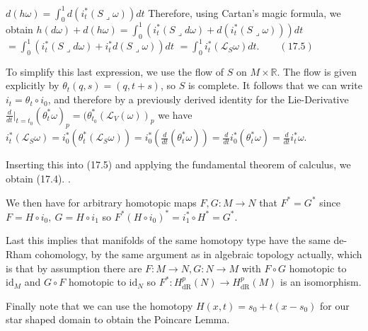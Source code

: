 \(d(h\omega)=\int_{0}^{1}d(i_{t}^{*}(S \lrcorner \omega))dt\)
Therefore, using Cartan's magic formula, we obtain
\(h(d\omega)+d(h\omega)=\int_{0}^{1}(i_{t}^{*}(S \lrcorner d\omega)+d(i_{t}^{*}(S \lrcorner \omega)))dt\)
\(=\int_{0}^{1}(i_{t}^{*}(S \lrcorner d\omega)+i_{t}^{*}d(S \lrcorner \omega))dt\)
\(=\int_{0}^{1}i_{t}^{*}(\mathcal{L}_{S}\omega)dt. \qquad (17.5)\)

To simplify this last expression, we use the flow of \(S\) on \(M \times \mathbb{R}\). 
The flow is given explicitly by \(\theta_{t}(q,s)=(q,t+s)\), so \(S\) is complete. It
follows that we can write \(i_{t}=\theta_{t} \circ i_{0}\), and therefore by a previously derived identity for the Lie-Derivative 
\( \frac{d}{dt}|_{t = t_0}(\theta^\ast_t \omega)_p = (\theta^\ast_{t_0}(\mathcal{L}_V(\omega))_p \)
we have
\(i_{t}^{*}(\mathcal{L}_{S}\omega)=i_{0}^{*}(\theta_{t}^{*}(\mathcal{L}_{S}\omega))=i_{0}^{*}(\frac{d}{dt}(\theta_{t}^{*}\omega))=\frac{d}{dt}i_{0}^{*}(\theta_{t}^{*}\omega)=\frac{d}{dt}i_{t}^{*}\omega.\)

Inserting this into (17.5) and applying the fundamental theorem of calculus, we
obtain (17.4). \qquad \square.

We then have for arbitrary homotopic maps  \( F, G : M \to N \) that 
\( F^\ast = G^\ast \) since \( F = H \circ i_0,\ G = H \circ i_1 \)
so \( F^\ast (H \circ i_0)^\ast = i_1^\ast \circ H^\ast = G^\ast \).

Last this implies that manifolds of the same homotopy type have the same de-Rham cohomology,
by the same argument as in algebraic topology actually, which is 
that by assumption there are \( F : M \to N, G : N \to M \) with \( F \circ G \) homotopic to \( \text{id}_{M} \)
and \( G \circ F \) homotopic to \( \text{id}_{N} \) so \( F^\ast : H_{\text{dR}}^p(N) \to H_{\text{dR}}^p(M) \)
is an isomorphism.

Finally note that we can use the homotopy \( H(x, t) = s_0 + t(x - s_0) \) for our star shaped domain to obtain the Poincare Lemma. 
